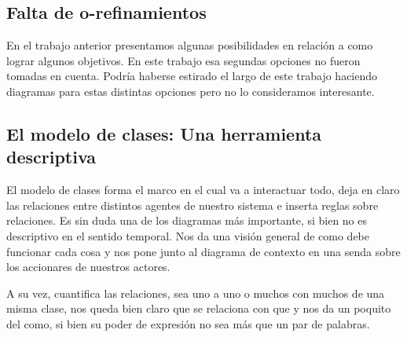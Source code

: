 \subsection{Falta de o-refinamientos}

En el trabajo anterior presentamos algunas posibilidades en relación a como lograr algunos objetivos. En este trabajo esa segundas opciones no fueron tomadas en cuenta. Podría haberse estirado el largo de este trabajo haciendo diagramas para estas distintas opciones pero no lo consideramos interesante. 

\subsection{El modelo de clases: Una herramienta descriptiva}

El modelo de clases forma el marco en el cual va a interactuar todo, deja en claro las relaciones entre distintos agentes de nuestro sistema e inserta reglas sobre relaciones. Es sin duda una de los diagramas más importante, si bien no es descriptivo en el sentido temporal. Nos da una visión general de como debe funcionar cada cosa y nos pone junto al diagrama de contexto en una senda sobre los accionares de nuestros actores. 

A su vez, cuantifica las relaciones, sea uno a uno o muchos con muchos de una misma clase, nos queda bien claro que se relaciona con que y nos da un poquito del como, si bien su poder de expresión no sea más que un par de palabras.


